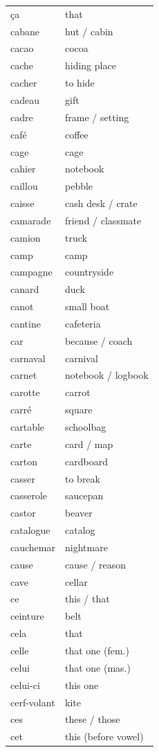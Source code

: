 \documentclass[12pt,a4paper]{article}
\begin{document}
\begin{longtable}{p{4cm} p{6cm}}
ça & that \\
cabane & hut / cabin \\
cacao & cocoa \\
cache & hiding place \\
cacher & to hide \\
cadeau & gift \\
cadre & frame / setting \\
café & coffee \\
cage & cage \\
cahier & notebook \\
caillou & pebble \\
caisse & cash desk / crate \\
camarade & friend / classmate \\
camion & truck \\
camp & camp \\
campagne & countryside \\
canard & duck \\
canot & small boat \\
cantine & cafeteria \\
car & because / coach \\
carnaval & carnival \\
carnet & notebook / logbook \\
carotte & carrot \\
carré & square \\
cartable & schoolbag \\
carte & card / map \\
carton & cardboard \\
casser & to break \\
casserole & saucepan \\
castor & beaver \\
catalogue & catalog \\
cauchemar & nightmare \\
cause & cause / reason \\
cave & cellar \\
ce & this / that \\
ceinture & belt \\
cela & that \\
celle & that one (fem.) \\
celui & that one (mas.) \\
celui-ci & this one \\
cerf-volant & kite \\
ces & these / those \\
cet & this (before vowel) \\

\end{longtable}
\end{document}
